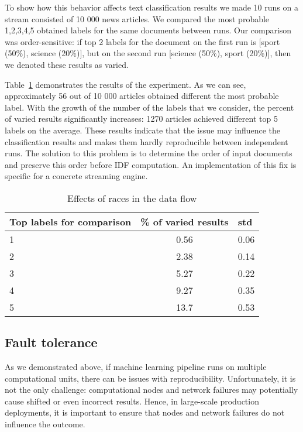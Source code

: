 To show how this behavior affects text classification results we made 10 runs on a stream consisted of 10 000 news articles. We compared the most probable 1,2,3,4,5 obtained labels for the same documents between runs. Our comparison was order-sensitive: if top 2 labels for the document on the first run is [sport (50\%), science (20\%)], but on the second run [science (50\%), sport (20\%)], then we denoted these results as varied. 

Table~\ref{race_table} demonstrates the results of the experiment. As we can see, approximately 56 out of 10 000 articles obtained different the most probable label. With the growth of the number of the labels that we consider, the percent of varied results significantly increases: 1270 articles achieved different top 5 labels on the average. These results indicate that the issue may influence the classification results and makes them hardly reproducible between independent runs. The solution to this problem is to determine the order of input documents and preserve this order before IDF computation. An implementation of this fix is specific for a concrete streaming engine.

\begin{table}[htbp]
\caption{Effects of races in the data flow}
\begin{threeparttable}
\begin{tabular}{lcl}
Top labels for comparison    & \% of varied results & std    \\
\hline
1   &   0.56    &   0.06    \\
2   &   2.38    &   0.14    \\
3   &   5.27    &   0.22    \\
4   &   9.27    &   0.35    \\
5   &   13.7    &   0.53    \\
\end{tabular}
\end{threeparttable}
\label{race_table}
\end{table}

\subsection{Fault tolerance}

As we demonstrated above, if machine learning pipeline runs on multiple computational units, there can be issues with reproducibility. Unfortunately, it is not the only challenge: computational nodes and network failures may potentially cause shifted or even incorrect results. Hence, in large-scale production deployments, it is important to ensure that nodes and network failures do not influence the outcome.

